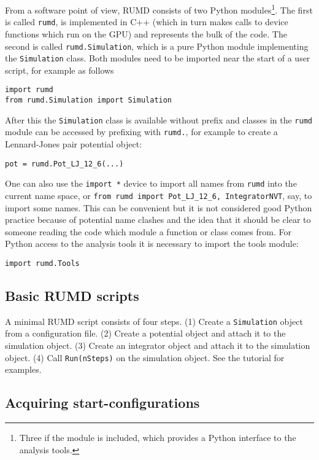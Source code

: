 \documentclass[a4paper]{article}
\begin{document}
From a software point of view, RUMD consists of two Python 
modules\footnote{Three if the  module is included, which 
provides a Python interface to the analysis tools.}. The first 
is called \verb|rumd|, is implemented in C++ 
(which in turn makes calls to device functions which run on the GPU) and
represents the bulk of the code. The second is called \verb|rumd.Simulation|, 
which is a pure Python module implementing the \verb|Simulation| class.
Both modules need to be imported near the start of a user script, for example 
as follows

\begin{verbatim}
import rumd
from rumd.Simulation import Simulation
\end{verbatim}
After this the \verb|Simulation| class is available without prefix and classes in the \verb|rumd| module can be accessed by prefixing with \verb|rumd.|, for example to create a Lennard-Jones pair potential object:

\begin{verbatim}
pot = rumd.Pot_LJ_12_6(...)
\end{verbatim}
One can also use the \verb|import *| device to import all names from \verb|rumd|
into the current name space, or 
\verb|from rumd import Pot_LJ_12_6, IntegratorNVT|, say, to import some names. 
This can be convenient but it is not considered
good Python practice because of potential name clashes and the idea that it 
should be clear to someone reading the code which module a function or class 
comes from. For Python access to
the analysis tools it is necessary to import the tools module:
\begin{verbatim}
import rumd.Tools
\end{verbatim}


\subsection{Basic  RUMD scripts}


A minimal RUMD script consists of four steps. (1) Create a \verb|Simulation| object from a configuration file. (2) Create a potential object and attach it to the simulation object. (3) Create an integrator object and attach it to the simulation object. (4) Call \verb|Run(nSteps)| on the simulation object. See the tutorial for examples.

\subsection{Acquiring start-configurations}
\end{document}
